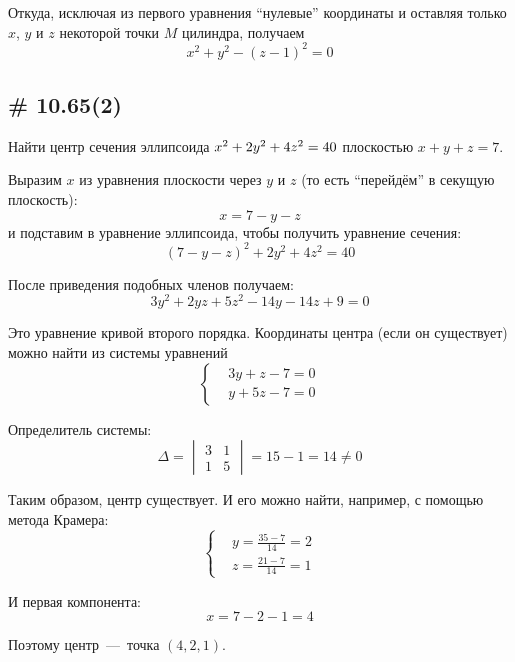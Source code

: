 \documentclass[a4paper,12pt]{article}
\begin{document}
\begin{solution}
    Откуда, исключая из первого уравнения ``нулевые'' координаты и оставляя только $x$, $y$ и $z$ некоторой точки $M$ цилиндра, получаем
    \[
      x^2 + y^2 - (z - 1)^2 = 0
    \]
  \end{solution}


  \subsection{\# 10.65(2)}
  
  Найти центр сечения эллипсоида
  $
    x^2 \hm+ 2y^2 \hm+ 4z^2 \hm= 40
  $
  плоскостью
  $
    x + y + z = 7
  $.
  
  \begin{solution}
    Выразим $x$ из уравнения плоскости через $y$ и $z$ (то есть ``перейдём'' в секущую плоскость):
    \[
      x = 7 - y - z
    \]
    и подставим в уравнение эллипсоида, чтобы получить уравнение сечения:
    \[
      (7 - y - z)^2 + 2y^2 + 4z^2 = 40
    \]
    
    После приведения подобных членов получаем:
    \[
      3y^2 + 2yz + 5z^2 - 14y - 14z + 9 = 0
    \]
    
    Это уравнение кривой второго порядка.
    Координаты центра (если он существует) можно найти из системы уравнений  %
    \[
      \left\{
        \begin{aligned}
          &3y + z - 7 = 0\\
          &y + 5z - 7 = 0
        \end{aligned}
      \right.
    \]
    
    Определитель системы:
    \[
      \Delta = \begin{vmatrix} 3 & 1 \\ 1 & 5 \end{vmatrix} = 15 - 1 = 14 \not= 0
    \]
    
    Таким образом, центр существует.
    И его можно найти, например, с помощью метода Крамера:
    \[
      \left\{
        \begin{aligned}
          &y = \frac{35 - 7}{14} = 2\\
          &z = \frac{21 - 7}{14} = 1
        \end{aligned}
      \right.
    \]
    
    И первая компонента:
    \[
      x = 7 - 2 - 1 = 4
    \]
    
    Поэтому центр~---~точка $(4, 2, 1)$.
  \end{solution}
\end{document}
